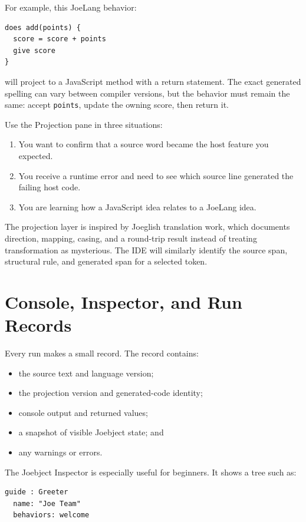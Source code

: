 \documentclass[12pt]{article}
\newcommand{\kw}[1]{\texttt{#1}}
\begin{document}
For example, this JoeLang behavior:

\begin{lstlisting}[style=joe]
does add(points) {
  score = score + points
  give score
}
\end{lstlisting}

will project to a JavaScript method with a return statement. The exact generated spelling can vary between compiler versions, but the behavior must remain the same: accept \kw{points}, update the owning score, then return it.

Use the Projection pane in three situations:
\begin{enumerate}
  \item You want to confirm that a source word became the host feature you expected.
  \item You receive a runtime error and need to see which source line generated the failing host code.
  \item You are learning how a JavaScript idea relates to a JoeLang idea.
\end{enumerate}

The projection layer is inspired by Joeglish translation work, which documents direction, mapping, casing, and a round-trip result instead of treating transformation as mysterious.\cite{translatorReadme,translatorEngine} The IDE will similarly identify the source span, structural rule, and generated span for a selected token.

\clearpage
\section{Console, Inspector, and Run Records}
Every run makes a small record. The record contains:

\begin{itemize}
  \item the source text and language version;
  \item the projection version and generated-code identity;
  \item console output and returned values;
  \item a snapshot of visible Joebject state; and
  \item any warnings or errors.
\end{itemize}

The Joebject Inspector is especially useful for beginners. It shows a tree such as:

\begin{lstlisting}[style=joe]
guide : Greeter
  name: "Joe Team"
  behaviors: welcome
\end{lstlisting}
\end{document}
